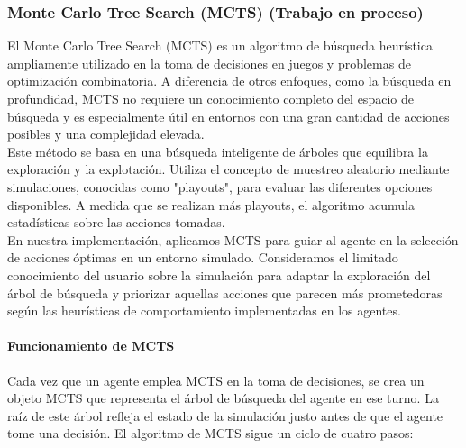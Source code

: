 \documentclass[11pt]{article}
\begin{document}
\subsubsection{Monte Carlo Tree Search (MCTS) (Trabajo en proceso)}
El Monte Carlo Tree Search (MCTS) es un algoritmo de búsqueda heurística ampliamente utilizado en la toma de decisiones en juegos y problemas de optimización combinatoria.
A diferencia de otros enfoques, como la búsqueda en profundidad, MCTS no requiere un conocimiento completo del espacio de búsqueda y es especialmente útil en entornos con una gran cantidad de acciones posibles y una complejidad elevada.\\

Este método se basa en una búsqueda inteligente de árboles que equilibra la exploración y la explotación. Utiliza el concepto de muestreo aleatorio mediante simulaciones, conocidas como "playouts", para evaluar las diferentes opciones disponibles.
A medida que se realizan más playouts, el algoritmo acumula estadísticas sobre las acciones tomadas.\\

En nuestra implementación, aplicamos MCTS para guiar al agente en la selección de acciones óptimas en un entorno simulado. Consideramos el limitado conocimiento del usuario sobre la simulación para adaptar la exploración del árbol de búsqueda
y priorizar aquellas acciones que parecen más prometedoras según las heurísticas de comportamiento implementadas en los agentes.\\

\paragraph{Funcionamiento de MCTS}
Cada vez que un agente emplea MCTS en la toma de decisiones, se crea un objeto MCTS que representa el árbol de búsqueda del agente en ese turno. La raíz de este árbol refleja el estado de la simulación justo antes de que el agente tome una decisión.
El algoritmo de MCTS sigue un ciclo de cuatro pasos:\\
\end{document}
